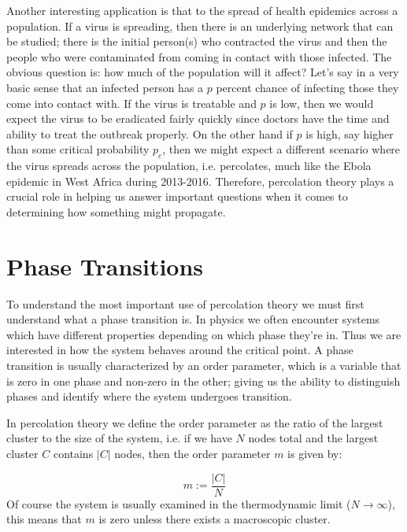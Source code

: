 Another interesting application is that to the spread of health epidemics across a population.
If a virus is spreading, then there is an underlying network that can be studied; there is the initial person(s) who contracted the virus and then the people who were contaminated from coming in contact with those infected.
The obvious question is: how much of the population will it affect?
Let's say in a very basic sense that an infected person has a $p$ percent chance of infecting those they come into contact with.
If the virus is treatable and $p$ is low, then we would expect the virus to be eradicated fairly quickly since doctors have the time and ability to treat the outbreak properly.
On the other hand if $p$ is high, say higher than some critical probability $p_c$, then we might expect a different scenario where the virus spreads across the population, i.e. percolates, much like the Ebola epidemic in West Africa during 2013-2016.
Therefore, percolation theory plays a crucial role in helping us answer important questions when it comes to determining how something might propagate.



\section{Phase Transitions}
To understand the most important use of percolation theory we must first understand what a phase transition is.
In physics we often encounter systems which have different properties depending on which phase they're in.
Thus we are interested in how the system behaves around the critical point.
A phase transition is usually characterized by an order parameter, which is a variable that is zero in one phase and non-zero in the other; giving us the ability to distinguish phases and identify where the system undergoes transition.

In percolation theory we define the order parameter as the ratio of the largest cluster to the size of the system, i.e. if we have $N$ nodes total and the largest cluster $C$ contains $|C|$ nodes, then the order parameter $m$ is given by:

\begin{equation}
	\label{eqn:order_parameter}
	m := \frac{|C|}{N}
\end{equation}
Of course the system is usually examined in the thermodynamic limit ($N \rightarrow \infty$), this means that $m$ is zero unless there exists a macroscopic cluster.

